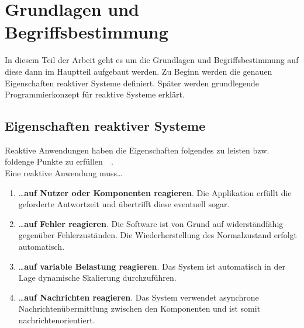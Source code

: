 \chapter{Grundlagen und Begriffsbestimmung}

In diesem Teil der Arbeit geht es um die Grundlagen und Begriffsbestimmung auf diese dann im Hauptteil aufgebaut werden. Zu Beginn werden die genauen Eigenschaften reaktiver Systeme definiert. Später werden grundlegende Programmierkonzept für reaktive Systeme erklärt.

\section{Eigenschaften reaktiver Systeme}

Reaktive Anwendungen haben die Eigenschaften folgendes zu leisten bzw. foldenge Punkte zu erfüllen~\cite[S.~19ff]{kuhn_reactive_2015}~\cite[S.~6]{vernon_reactive_2016}.\\
Eine reaktive Anwendung muss\ldots

\begin{enumerate}
    \item \ldots \textbf{auf Nutzer oder Komponenten reagieren}. Die Applikation erfüllt die geforderte Antwortzeit und übertrifft diese eventuell sogar.
    \item \ldots \textbf{auf Fehler reagieren}. Die Software ist von Grund auf widerständfähig gegenüber Fehlerzuständen. Die Wiederherstellung des Normalzustand erfolgt automatisch.
    \item \ldots \textbf{auf variable Belastung reagieren}. Das System ist automatisch in der Lage dynamische Skalierung durchzuführen.
    \item \ldots \textbf{auf Nachrichten reagieren}. Das System verwendet asynchrone Nachrichtenübermittlung zwischen den Komponenten und ist somit nachrichtenorientiert.
\end{enumerate}

\pagebreak

